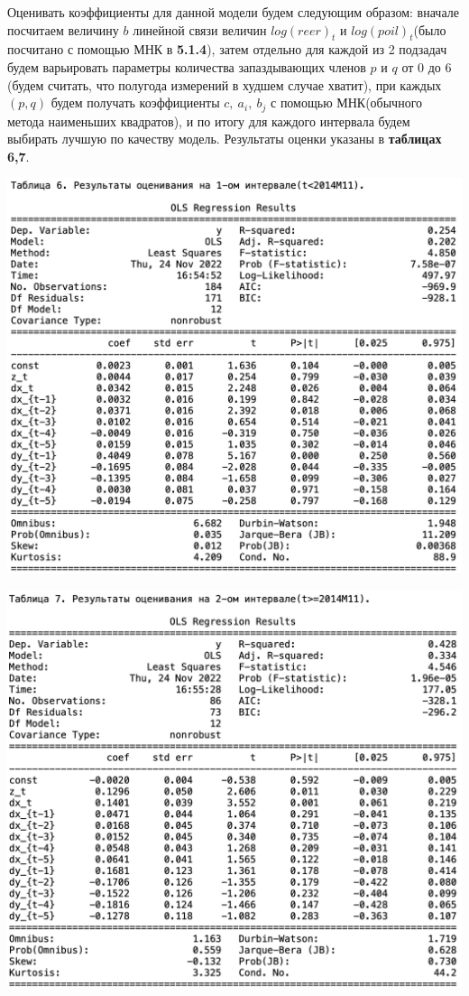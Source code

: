 \documentclass{article}
\begin{document}
Оценивать коэффициенты для данной модели будем следующим образом: вначале посчитаем величину $b$ линейной связи величин $log(reer)_t$ и $log(poil)_t$(было посчитано с помощью МНК в \textbf{5.1.4}), затем отдельно для каждой из 2 подзадач будем варьировать параметры количества запаздывающих членов $p$ и $q$ от $0$ до $6$(будем считать, что полугода измерений в худшем случае хватит), при каждых $(p,q)$ будем получать коэффициенты $c,~a_i,~b_j$ с помощью МНК(обычного метода наименьших квадратов), и по итогу для каждого интервала будем выбирать лучшую по качеству модель. Результаты оценки указаны в \textbf{таблицах 6,7}.

\begin{center}
\includegraphics[width=150mm]{pics/table6.png}
\end{center}

\begin{center}
\includegraphics[width=150mm]{pics/table7.png}
\end{center}
\end{document}
